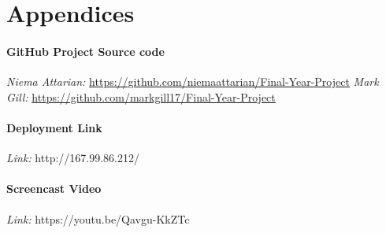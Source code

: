 \chapter{Appendices}

\subsubsection{GitHub Project Source code}

\textit{Niema Attarian:} \href{https://github.com/niemaattarian/Final-Year-Project}{https://github.com/niemaattarian/Final-Year-Project}
\newline
\textit{Mark Gill:} \href{https://github.com/markgill17/Final-Year-Project}{https://github.com/markgill17/Final-Year-Project}

\subsubsection{Deployment Link}
\textit{Link:} http://167.99.86.212/

\subsubsection{Screencast Video}
\textit{Link:} https://youtu.be/Qavgu-KkZTc
